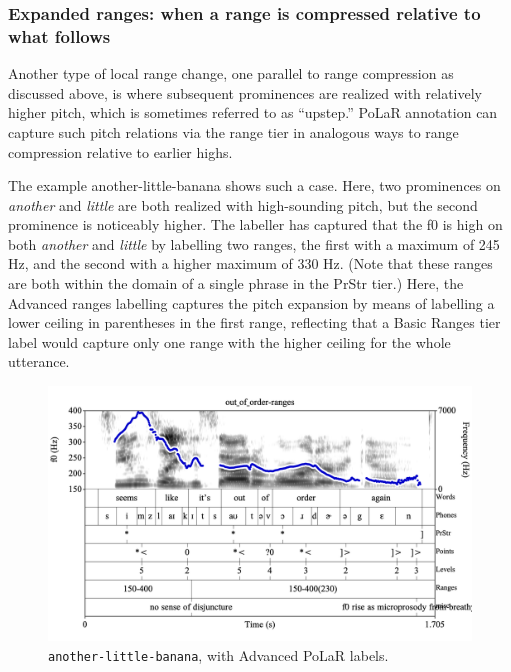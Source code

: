 \documentclass[11pt, twoside]{memoir}
\def\langtext#1{\textit{#1}}
\begin{document}
\subsubsection{Expanded ranges: when a range is compressed relative to what follows}\label{sec:expanded-ranges-when-a-range-is-compressed-relative-to-what-follows}

Another type of local range change, one parallel to range compression as discussed above, is where subsequent prominences are realized with relatively higher pitch, which is sometimes referred to as “upstep.” PoLaR annotation can capture such pitch relations via the range tier in analogous ways to range compression relative to earlier highs.

The example another-little-banana shows such a case. Here, two prominences on \langtext{another} and \langtext{little} are both realized with high-sounding pitch, but the second prominence is noticeably higher. The labeller has captured that the f0 is high on both \langtext{another} and \langtext{little} by labelling two ranges, the first with a maximum of 245 Hz, and the second with a higher maximum of 330 Hz. (Note that these ranges are both within the domain of a single phrase in the PrStr tier.) Here, the Advanced ranges labelling captures the pitch expansion by means of labelling a lower ceiling in parentheses in the first range, reflecting that a Basic Ranges tier label would capture only one range with the higher ceiling for the whole utterance.

\begin{figure}[H]
\centering
%
\includegraphics[width=.875\linewidth]{Ranges-another-little-banana-adv.png}
%
\caption{\texttt{another-little-banana}, with Advanced PoLaR labels.%
\label{fig:another-little-banana Ranges Adv}%
}
\end{figure}
\end{document}
